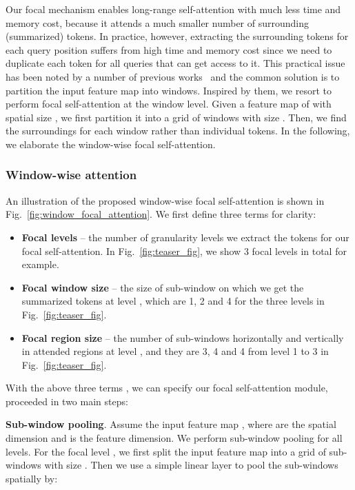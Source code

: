 \documentclass{article}
\begin{document}
Our focal mechanism enables long-range self-attention with much less time and memory cost, because it attends a much smaller number of surrounding (summarized) tokens. In practice, however, extracting the surrounding tokens for each query position suffers from high time and memory cost since we need to duplicate each token for all queries that can get access to it. This practical issue has been noted by a number of previous works~\cite{vaswani2021scaling,zhang2021multi,liu2021swin} and the common solution is to partition the input feature map into windows. Inspired by them, we resort to perform focal self-attention at the window level. Given a feature map of  with spatial size , we first partition it into a grid of windows with size . Then, we find the surroundings for each window rather than individual tokens. In the following, we elaborate the window-wise focal self-attention.

\subsubsection{Window-wise attention}

An illustration of the proposed window-wise focal self-attention is shown in Fig.~\ref{fig:window_focal_attention}. We first define three terms for clarity:
\begin{itemize}[noitemsep,topsep=0pt,leftmargin=*]
    \item \textbf{Focal levels}  -- the number of granularity levels we extract the tokens for our focal self-attention. In Fig.~\ref{fig:teaser_fig}, we show 3 focal levels in total for example.
    \item \textbf{Focal window size}  -- the size of sub-window on which we get the summarized tokens at level , which are 1, 2 and 4 for the three levels in Fig.~\ref{fig:teaser_fig}.
    \item \textbf{Focal region size}  -- the number of sub-windows horizontally and vertically in attended regions at level , and they are 3, 4 and 4 from level 1 to 3 in Fig.~\ref{fig:teaser_fig}.
\end{itemize}

With the above three terms , we can specify our focal self-attention module, proceeded in two main steps:

\textbf{Sub-window pooling}. Assume the input feature map , where  are the spatial dimension and  is the feature dimension. We perform sub-window pooling for all  levels. For the focal level , we first split the input feature map  into a grid of sub-windows with size . Then we use a simple linear layer  to pool the sub-windows spatially by:
\end{document}
